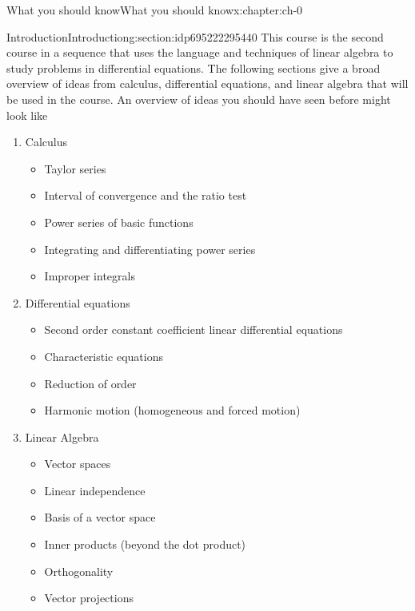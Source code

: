 \documentclass[oneside,10pt,]{book}
\numberwithin{equation}{section}
\numberwithin{equation}{section}
\begin{document}
\begin{chapterptx}{What you should know}{}{What you should know}{}{}{x:chapter:ch-0}
%
%
\typeout{************************************************}
\typeout{************************************************}
%
\begin{sectionptx}{Introduction}{}{Introduction}{}{}{g:section:idp695222295440}
This course is the second course in a sequence that uses the language and techniques of linear algebra to study problems in differential equations. The following sections give a broad overview of ideas from calculus, differential equations, and linear algebra that will be used in the course. An overview of ideas you should have seen before might look like%
%
\begin{enumerate}
\item{}Calculus%
\begin{itemize}[label=\textbullet]
\item{}Taylor series%
\item{}Interval of convergence and the ratio test%
\item{}Power series of basic functions%
\item{}Integrating and differentiating power series%
\item{}Improper integrals%
\end{itemize}
%
\item{}Differential equations%
\begin{itemize}[label=\textbullet]
\item{}Second order constant coefficient linear differential equations%
\item{}Characteristic equations%
\item{}Reduction of order%
\item{}Harmonic motion (homogeneous and forced motion)%
\end{itemize}
%
\item{}Linear Algebra%
\begin{itemize}[label=\textbullet]
\item{}Vector spaces%
\item{}Linear independence%
\item{}Basis of a vector space%
\item{}Inner products (beyond the dot product)%
\item{}Orthogonality%
\item{}Vector projections%
\end{itemize}
%
\end{enumerate}

\end{sectionptx}
\end{chapterptx}
\end{document}
